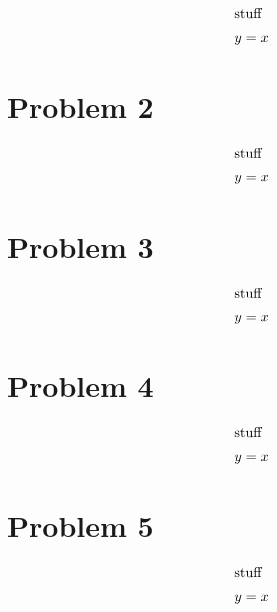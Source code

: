 \documentclass[12pt]{article}
\begin{document}
\begin{align} 
    \intertext{stuff}
    y&=x
\end{align}


\newpage
\section*{Problem 2}
\begin{align} 
    \intertext{stuff}
    y&=x
\end{align}



\newpage
\section*{Problem 3}

\begin{align} 
    \intertext{stuff}
    y&=x
\end{align}


\newpage
\section*{Problem 4}

\begin{align} 
    \intertext{stuff}
    y&=x
\end{align}



\newpage
\section*{Problem 5}

\begin{align} 
    \intertext{stuff}
    y&=x
\end{align}
\end{document}

